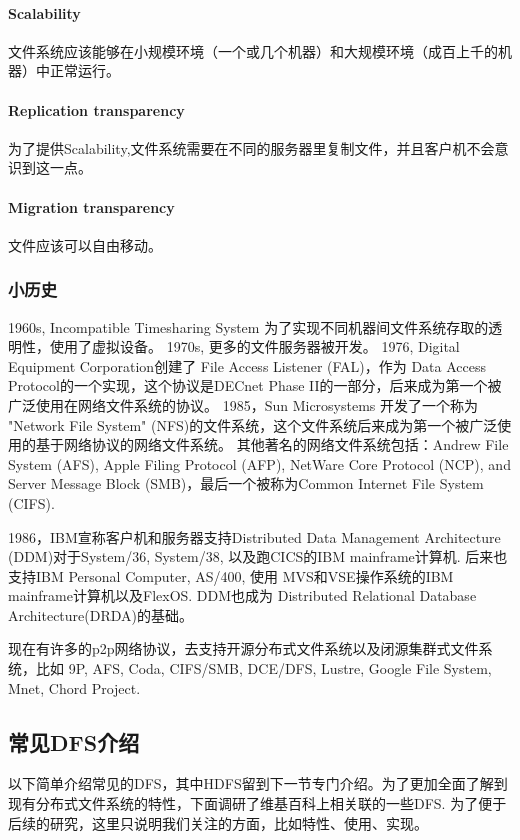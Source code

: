 \documentclass[UTF8]{ctexart}
\begin{document}
\paragraph{Scalability}
文件系统应该能够在小规模环境（一个或几个机器）和大规模环境（成百上千的机器）中正常运行。
\paragraph{Replication transparency}
为了提供Scalability,文件系统需要在不同的服务器里复制文件，并且客户机不会意识到这一点。
\paragraph{Migration transparency}
文件应该可以自由移动。

\subsubsection{小历史}
1960s, Incompatible Timesharing System 为了实现不同机器间文件系统存取的透明性，使用了虚拟设备。
1970s, 更多的文件服务器被开发。
1976, Digital Equipment Corporation创建了 File Access Listener (FAL)，作为 Data Access Protocol的一个实现，这个协议是DECnet Phase II的一部分，后来成为第一个被广泛使用在网络文件系统的协议。
1985，Sun Microsystems 开发了一个称为 "Network File System" (NFS)的文件系统，这个文件系统后来成为第一个被广泛使用的基于网络协议的网络文件系统。
其他著名的网络文件系统包括：Andrew File System (AFS), Apple Filing Protocol (AFP), NetWare Core Protocol (NCP), and Server Message Block (SMB)，最后一个被称为Common Internet File System (CIFS).

1986，IBM宣称客户机和服务器支持Distributed Data Management Architecture (DDM)对于System/36, System/38, 以及跑CICS的IBM mainframe计算机. 后来也支持IBM Personal Computer, AS/400, 使用 MVS和VSE操作系统的IBM mainframe计算机以及FlexOS. DDM也成为 Distributed Relational Database Architecture(DRDA)的基础。

现在有许多的p2p网络协议，去支持开源分布式文件系统以及闭源集群式文件系统，比如 9P, AFS, Coda, CIFS/SMB, DCE/DFS, Lustre, Google File System, Mnet, Chord Project.



\subsection{常见DFS介绍}
以下简单介绍常见的DFS，其中HDFS留到下一节专门介绍。为了更加全面了解到现有分布式文件系统的特性，下面调研了维基百科上相关联的一些DFS. 为了便于后续的研究，这里只说明我们关注的方面，比如特性、使用、实现。
\end{document}
